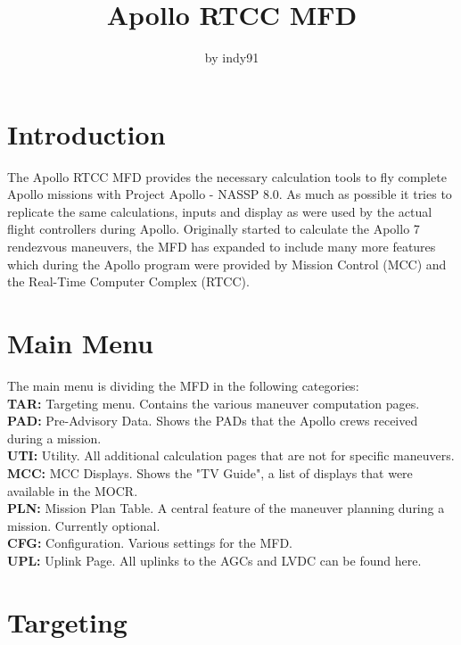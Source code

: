 \documentclass[11pt]{article} %
\title{Apollo RTCC MFD}
\author{by indy91}
\begin{document}
\maketitle

\section{Introduction}

The Apollo RTCC MFD provides the necessary calculation tools to fly complete Apollo missions with Project Apollo - NASSP 8.0. As much as possible it tries to replicate the same calculations, inputs and display as were used by the actual flight controllers during Apollo. Originally started to calculate the Apollo 7 rendezvous maneuvers, the MFD has expanded to include many more features which during the Apollo program were provided by Mission Control (MCC) and the Real-Time Computer Complex (RTCC).\\

\newpage
\tableofcontents
\newpage

\section{Main Menu}

The main menu is dividing the MFD in the following categories:\\
\textbf{TAR:} Targeting menu. Contains the various maneuver computation pages. \\
\textbf{PAD:} Pre-Advisory Data. Shows the PADs that the Apollo crews received during a mission.\\
\textbf{UTI:} Utility. All additional calculation pages that are not for specific maneuvers.\\
\textbf{MCC:} MCC Displays. Shows the "TV Guide", a list of displays that were available in the MOCR.\\
\textbf{PLN:} Mission Plan Table. A central feature of the maneuver planning during a mission. Currently optional.\\
\textbf{CFG:} Configuration. Various settings for the MFD.\\
\textbf{UPL:} Uplink Page. All uplinks to the AGCs and LVDC can be found here.\\

\section{Targeting}
\end{document}

